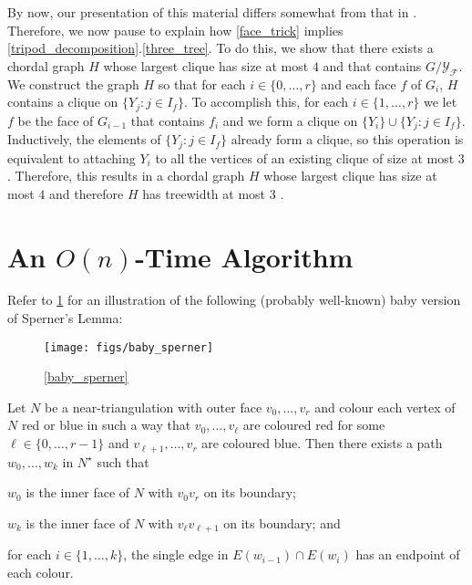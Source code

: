 \documentclass[a4paper,UKenglish,autoref]{lipics-v2021}
\begin{document}
By now, our presentation of this material differs somewhat from that in \cite{dujmovic.joret.ea:planar,ueckerdt.wood.ea:improved}.  Therefore, we now pause to explain how \cref{face_trick} implies \cref{tripod_decomposition}.\ref{three_tree}.  To do this, we show that there exists a chordal graph $H$ whose largest clique has size at most $4$ and that contains $G/\mathcal{Y_F}$. We construct the graph $H$ so that for each $i\in\{0,\ldots,r\}$ and each face $f$ of $G_i$, $H$ contains a clique on $\{Y_j:j\in I_f\}$. To accomplish this, for each $i\in\{1,\ldots,r\}$ we let $f$ be the face of $G_{i-1}$ that contains $f_i$ and we form a clique on $\{Y_i\}\cup\{Y_j:j\in I_f\}$.  Inductively, the elements of $\{Y_j:j\in I_f\}$ already form a clique, so this operation is equivalent to attaching $Y_i$ to all the vertices of an existing clique of size at most $3$. Therefore, this results in a chordal graph $H$ whose largest clique has size at most $4$ and therefore $H$ has treewidth at most $3$ \cite{gavril:intersection}.

\section{An $O(n)$-Time Algorithm}
\label{linear_time_algorithm}\label{algorithm}

Refer to \cref{baby_sperner_fig} for an illustration of the following (probably well-known) baby version of Sperner's Lemma:

\begin{figure}
  \begin{center}
    \texttt{[image: figs/baby\_sperner]}
  \end{center}
  \caption{\cref{baby_sperner}}
  \label{baby_sperner_fig}
\end{figure}

\begin{lem}\label{baby_sperner}
  Let $N$ be a near-triangulation with outer face $v_0,\ldots,v_r$ and colour each vertex of $N$ red or blue in such a way that $v_0,\ldots,v_\ell$ are coloured red for some $\ell\in\{0,\ldots,r-1\}$ and $v_{\ell+1},\ldots,v_r$ are coloured blue.  Then there exists a path $w_0,\ldots,w_k$ in $N^\star$ such that
  \begin{compactenum}
    \item $w_0$ is the inner face of $N$ with $v_0v_r$ on its boundary;
    \item $w_k$ is the inner face of $N$ with $v_{\ell}v_{\ell+1}$ on its boundary; and
    \item for each $i\in\{1,\ldots,k\}$, the single edge in $E(w_{i-1})\cap E(w_i)$ has an endpoint of each colour.
  \end{compactenum}
\end{lem}
\end{document}
